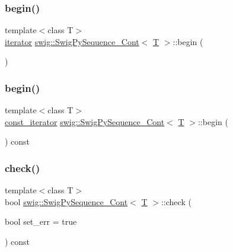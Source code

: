 \subsubsection{\texorpdfstring{begin()}{begin()}\hspace{0.1cm}{\footnotesize\ttfamily [1/2]}}
{\footnotesize\ttfamily template$<$class T$>$ \\
\hyperlink{structswig_1_1_swig_py_sequence___cont_abcd331d0657a109f34c0fd84c5be87dd}{iterator} \hyperlink{structswig_1_1_swig_py_sequence___cont}{swig\+::\+Swig\+Py\+Sequence\+\_\+\+Cont}$<$ \hyperlink{fmt_8h_a0acb682b8260ab1c60b918599864e2e5}{T} $>$\+::begin (\begin{DoxyParamCaption}{ }\end{DoxyParamCaption})\hspace{0.3cm}{\ttfamily [inline]}}

\mbox{\label{structswig_1_1_swig_py_sequence___cont_a63b34796bc977555647bed8dd4f50385}} 
\subsubsection{\texorpdfstring{begin()}{begin()}\hspace{0.1cm}{\footnotesize\ttfamily [2/2]}}
{\footnotesize\ttfamily template$<$class T$>$ \\
\hyperlink{structswig_1_1_swig_py_sequence___cont_a708a6b3790b68aa53bd79d27a2c16b89}{const\+\_\+iterator} \hyperlink{structswig_1_1_swig_py_sequence___cont}{swig\+::\+Swig\+Py\+Sequence\+\_\+\+Cont}$<$ \hyperlink{fmt_8h_a0acb682b8260ab1c60b918599864e2e5}{T} $>$\+::begin (\begin{DoxyParamCaption}{ }\end{DoxyParamCaption}) const\hspace{0.3cm}{\ttfamily [inline]}}

\mbox{\label{structswig_1_1_swig_py_sequence___cont_adde81d1400800d54b6a8cd0afd234438}} 
\subsubsection{\texorpdfstring{check()}{check()}}
{\footnotesize\ttfamily template$<$class T$>$ \\
bool \hyperlink{structswig_1_1_swig_py_sequence___cont}{swig\+::\+Swig\+Py\+Sequence\+\_\+\+Cont}$<$ \hyperlink{fmt_8h_a0acb682b8260ab1c60b918599864e2e5}{T} $>$\+::check (\begin{DoxyParamCaption}\item[{bool}]{set\+\_\+err = {\ttfamily true} }\end{DoxyParamCaption}) const\hspace{0.3cm}{\ttfamily [inline]}}

